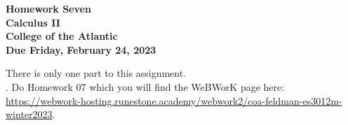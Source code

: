 \documentclass[12pt]{article}
\begin{document}
\pagestyle{empty}
 
\begin{center}
{\LARGE {\bf Homework Seven}}\\
\bigskip
{\Large {\bf Calculus II}}\\
\bigskip
{\Large {\bf College of the Atlantic}}\\
\bigskip
{ {\bf Due Friday, February 24, 2023}}\\ 
\end{center}
\medskip


\noindent There is only one part to this assignment.\\

.  Do Homework 07 which you
will find the WeBWorK page here:
\url{https://webwork-hosting.runestone.academy/webwork2/coa-feldman-es3012m-winter2023}.





\end{document}
